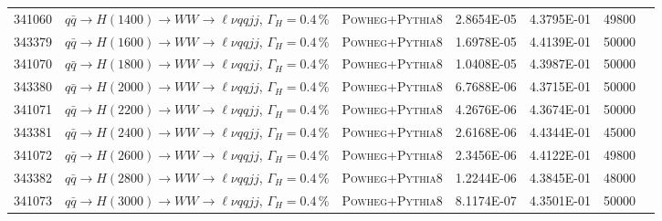 \begin{landscape}
\begin{table}[!htb]
\begin{footnotesize}
\begin{center}
\begin{tabular}{c|l|c|c|c|cr}
	341060 & $q\bar{q} \to H(1400) \to WW \to \ell\nu qq  jj$, $\Gamma_H=0.4\,\%$ & \textsc{Powheg}+\textsc{Pythia8} & 2.8654E-05 & 4.3795E-01 & 49800 \\
	343379 & $q\bar{q} \to H(1600) \to WW \to \ell\nu qq  jj$, $\Gamma_H=0.4\,\%$ & \textsc{Powheg}+\textsc{Pythia8} & 1.6978E-05 & 4.4139E-01 & 50000 \\
	341070 & $q\bar{q} \to H(1800) \to WW \to \ell\nu qq  jj$, $\Gamma_H=0.4\,\%$ & \textsc{Powheg}+\textsc{Pythia8} & 1.0408E-05 & 4.3987E-01 & 50000 \\
	343380 & $q\bar{q} \to H(2000) \to WW \to \ell\nu qq  jj$, $\Gamma_H=0.4\,\%$ & \textsc{Powheg}+\textsc{Pythia8} & 6.7688E-06 & 4.3715E-01 & 50000 \\
	341071 & $q\bar{q} \to H(2200) \to WW \to \ell\nu qq  jj$, $\Gamma_H=0.4\,\%$ & \textsc{Powheg}+\textsc{Pythia8} & 4.2676E-06 & 4.3674E-01 & 50000 \\
	343381 & $q\bar{q} \to H(2400) \to WW \to \ell\nu qq  jj$, $\Gamma_H=0.4\,\%$ & \textsc{Powheg}+\textsc{Pythia8} & 2.6168E-06 & 4.4344E-01 & 45000 \\
	341072 & $q\bar{q} \to H(2600) \to WW \to \ell\nu qq  jj$, $\Gamma_H=0.4\,\%$ & \textsc{Powheg}+\textsc{Pythia8} & 2.3456E-06 & 4.4122E-01 & 49800 \\
	343382 & $q\bar{q} \to H(2800) \to WW \to \ell\nu qq  jj$, $\Gamma_H=0.4\,\%$ & \textsc{Powheg}+\textsc{Pythia8} & 1.2244E-06 & 4.3845E-01 & 48000 \\
	341073 & $q\bar{q} \to H(3000) \to WW \to \ell\nu qq  jj$, $\Gamma_H=0.4\,\%$ & \textsc{Powheg}+\textsc{Pythia8} & 8.1174E-07 & 4.3501E-01 & 50000 \\
        \hline\hline
\end{tabular}
\end{center}
\end{footnotesize}
\end{table}


\end{landscape}
